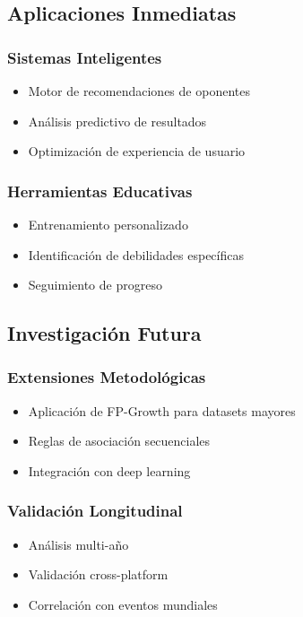 \documentclass[11pt,a4paper]{article}
\begin{document}
\subsection{Aplicaciones Inmediatas}

\subsubsection{Sistemas Inteligentes}
\begin{itemize}
\item Motor de recomendaciones de oponentes
\item An\'alisis predictivo de resultados
\item Optimizaci\'on de experiencia de usuario
\end{itemize}

\subsubsection{Herramientas Educativas}
\begin{itemize}
\item Entrenamiento personalizado
\item Identificaci\'on de debilidades espec\'ificas
\item Seguimiento de progreso
\end{itemize}

\subsection{Investigaci\'on Futura}

\subsubsection{Extensiones Metodol\'ogicas}
\begin{itemize}
\item Aplicaci\'on de FP-Growth para datasets mayores
\item Reglas de asociaci\'on secuenciales
\item Integraci\'on con deep learning
\end{itemize}

\subsubsection{Validaci\'on Longitudinal}
\begin{itemize}
\item An\'alisis multi-a\~no
\item Validaci\'on cross-platform
\item Correlaci\'on con eventos mundiales
\end{itemize}
\end{document}
